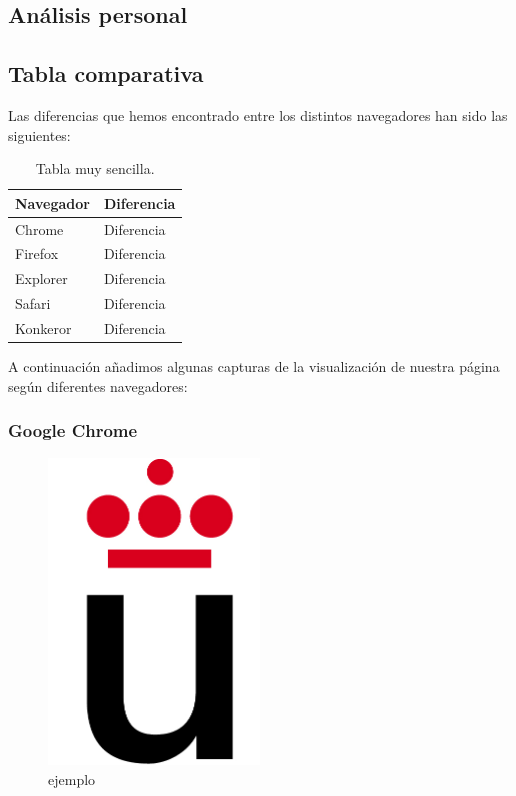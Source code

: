 \subsection{Análisis personal}
\subsection{Tabla comparativa}
Las diferencias que hemos encontrado entre los distintos navegadores han sido las siguientes:\\
\begin{table}[htbp]
	\begin{center}
		\begin{tabular}{|l|l|}
			\hline
			Navegador & Diferencia \\
			\hline \hline
			Chrome & Diferencia \\ \hline
			Firefox & Diferencia \\ \hline
			Explorer & Diferencia \\ \hline
			Safari & Diferencia \\ \hline
			Konkeror & Diferencia \\ \hline
		\end{tabular}
		\caption{Tabla muy sencilla.}
		\label{tabla:sencilla}
	\end{center}
\end{table}
A continuación añadimos algunas capturas de la visualización de nuestra página según diferentes navegadores:
\subsubsection{Google Chrome}

\begin{figure}[h]
	\centering
	\includegraphics[width=0.50\textwidth]{./Fotos/logoURJC.jpg}
	\caption{ejemplo}
	\label{fig: ejemplo}
\end{figure}


